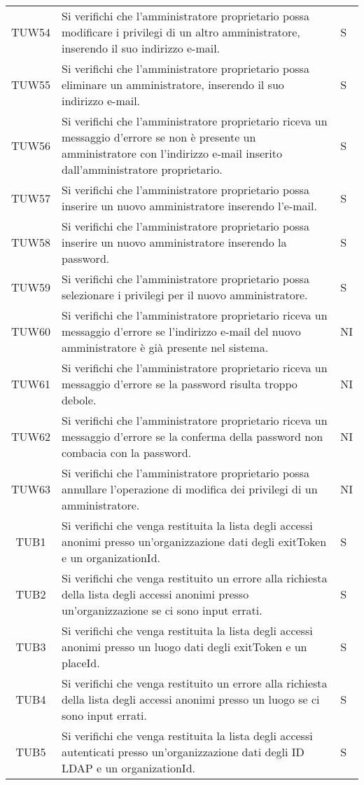 {\begin{longtable}{ c C{13cm} C{1cm}}
TUW54 & Si verifichi che l’amministratore proprietario possa modificare i privilegi di un altro amministratore, inserendo il suo indirizzo e-mail. & S \\
TUW55 & Si verifichi che l’amministratore proprietario possa eliminare un amministratore, inserendo il suo indirizzo e-mail. & S \\
TUW56 & Si verifichi che l’amministratore proprietario riceva un messaggio d'errore se non è presente un amministratore con l'indirizzo e-mail inserito dall'amministratore proprietario. & S \\
TUW57 & Si verifichi che l’amministratore proprietario possa inserire un nuovo amministratore inserendo l’e-mail. & S \\
TUW58 & Si verifichi che l’amministratore proprietario possa inserire un nuovo amministratore inserendo la password. & S \\
TUW59 & Si verifichi che l’amministratore proprietario possa selezionare i privilegi per il nuovo amministratore. & S \\
TUW60 & Si verifichi che l’amministratore proprietario riceva un messaggio d'errore se l'indirizzo e-mail del nuovo amministratore è già presente nel sistema. & NI \\
TUW61 & Si verifichi che l’amministratore proprietario riceva un messaggio d'errore se la password risulta troppo debole. & NI \\
TUW62 & Si verifichi che l’amministratore proprietario riceva un messaggio d'errore se la conferma della password non combacia con la password. & NI \\
TUW63 & Si verifichi che l’amministratore proprietario possa annullare l'operazione di modifica dei privilegi di un amministratore.  & NI \\
TUB1 & Si verifichi che venga restituita la lista degli accessi anonimi presso un'organizzazione dati degli exitToken e un organizationId. & S \\
TUB2 & Si verifichi che venga restituito un errore alla richiesta della lista degli accessi anonimi presso un'organizzazione se ci sono input errati. & S \\
TUB3 & Si verifichi che venga restituita la lista degli accessi anonimi presso un luogo dati degli exitToken e un placeId. & S \\
TUB4 & Si verifichi che venga restituito un errore alla richiesta della lista degli accessi anonimi presso un luogo se ci sono input errati. & S \\
TUB5 & Si verifichi che venga restituita la lista degli accessi autenticati presso un'organizzazione dati degli ID LDAP e un organizationId. & S \\

\end{longtable}}

